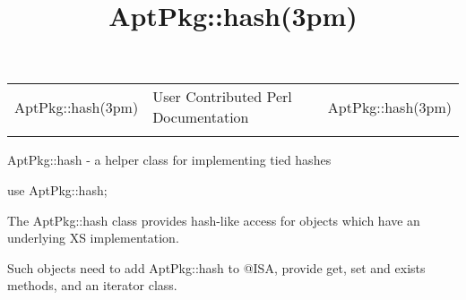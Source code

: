 \documentclass[]{article}
\title{AptPkg::hash(3pm)}
\author{}
\date{}
\begin{document}
\maketitle

\begin{longtable}[c]{@{}lll@{}}
\toprule\addlinespace
AptPkg::hash(3pm) & User Contributed Perl Documentation &
AptPkg::hash(3pm)
\\\addlinespace
\bottomrule
\end{longtable}


AptPkg::hash - a helper class for implementing tied hashes


use AptPkg::hash;


The AptPkg::hash class provides hash-like access for objects which have
an underlying XS implementation.

Such objects need to add AptPkg::hash to @ISA, provide get, set and
exists methods, and an iterator class.

\end{document}
